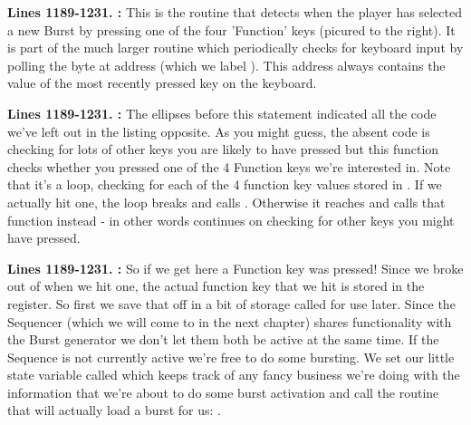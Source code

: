 \begin{figure}
%
\end{figure}
\textbf{Lines 1189-1231. :} This is the routine that detects when the player has selected a new
Burst by pressing one of the four 'Function' keys (picured to the right). It is part of the much larger routine  which periodically checks
for keyboard input by polling the byte at address  (which we label ). This address always
contains the value of the most recently pressed key on the keyboard.

\textbf{Lines 1189-1231. :} The ellipses before this statement indicated all the code we've
left out in the listing opposite. As you might guess, the absent code is checking for lots of other keys you are likely to have pressed but
this function checks whether you pressed one of the 4 Function keys we're interested in. Note that it's a loop, checking for each of the 4
function key values stored in . If we actually hit one, the loop breaks and calls . Otherwise
it reaches  and calls that function instead - in other words continues on checking for other keys you might have
pressed.

\textbf{Lines 1189-1231. :} So if we get here a Function key was pressed! Since we broke out of 
when we hit one, the actual function key that we hit is stored in the  register. So first we save that off in a bit of storage called
 for use later. Since the Sequencer (which we will come to in the next chapter) shares functionality with the Burst generator
we don't let them both be active at the same time. If the Sequence is not currently active we're free to do some bursting. We set our little state
variable called  which keeps track of any fancy business we're doing with the information that we're about to do some 
burst activation and call the routine that will actually load a burst for us: .


